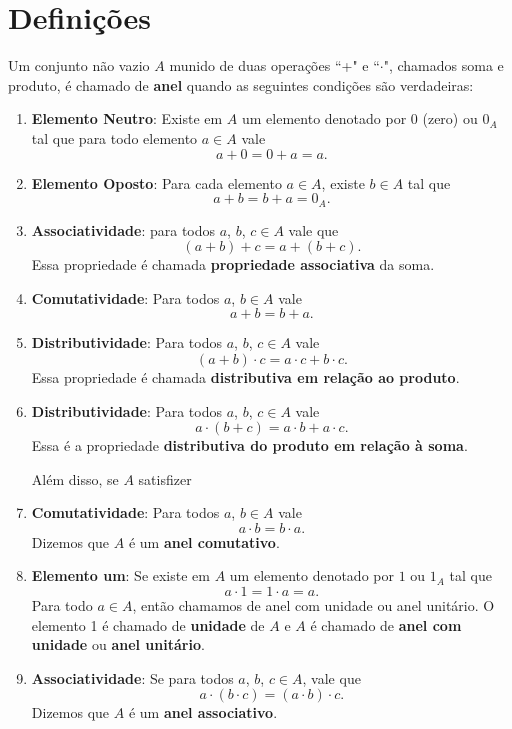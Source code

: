 
\section{Defini{\c c}{\~o}es}

\begin{definicao} Um conjunto n{\~a}o vazio $A$ munido de duas opera{\c c}{\~o}es ``+" e ``$\cdot$", chamados soma e produto, {\'e} chamado de \textbf{anel} quando as seguintes condi{\c c}{\~o}es s{\~a}o verdadeiras:
\begin{enumerate}
\item \textbf{Elemento Neutro}: Existe em $A$ um elemento denotado por 0 (zero) ou $0_{A}$ tal que para todo elemento $a\in A$ vale
\[
	a + 0 = 0 + a = a.
\]

\item \textbf{Elemento Oposto}: Para cada elemento $a\in A$, existe $b\in A$ tal que
\[
	a + b = b + a = 0_A.
\]

\item \textbf{Associatividade}: para todos $a$, $b$, $c\in A$ vale que
\[
	(a + b) + c = a + (b + c).
\]
Essa propriedade {\'e} chamada \textbf{propriedade associativa} da soma.

\item \textbf{Comutatividade}: Para todos $a$, $b \in A$ vale
\[
	a + b = b + a.
\]

\item \textbf{Distributividade}: Para todos $a$, $b$, $c \in A$ vale
\[
	(a + b)\cdot c = a\cdot c + b\cdot c.
\]
Essa propriedade {\'e} chamada \textbf{distributiva em rela{\c c}{\~a}o ao produto}.

\item \textbf{Distributividade}: Para todos $a$, $b$, $c\in A$ vale
\[
	a\cdot(b + c) = a\cdot b + a\cdot c.
\]
Essa {\'e} a propriedade \textbf{distributiva do produto em rela{\c c}{\~a}o {\`a} soma}.

Al{\'e}m disso, se $A$ satisfizer
\item \textbf{Comutatividade}: Para todos $a$, $b\in A$ vale
\[
	a\cdot b = b\cdot a.
\]
Dizemos que $A$ {\'e} um \textbf{anel comutativo}.

\item \textbf{Elemento um}: Se existe em $A$ um elemento denotado por $1$ ou $1_{A}$ tal que
\[
	a\cdot 1 = 1\cdot a = a.
\]
Para todo $a\in A$, ent{\~a}o chamamos de anel com unidade ou anel unit{\'a}rio. O elemento 1 {\'e} chamado de \textbf{unidade} de $A$ e $A$ \'e chamado de \textbf{anel com unidade} ou \textbf{anel unit\'ario}.

\item \textbf{Associatividade}: Se para todos $a$, $b$, $c\in A$, vale que
\[
	a\cdot (b\cdot c) = (a\cdot b)\cdot c.
\]
Dizemos que $A$ {\'e} um \textbf{anel associativo}.
\end{enumerate}
\end{definicao}

